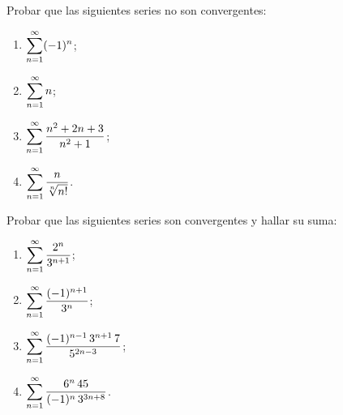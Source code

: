 \item Probar que las siguientes series no son convergentes:
\begin{multicols}{2}
\begin{enumerate}
    \item $\displaystyle\sum_{n=1}^\infty (-1)^n$;
    \item $\displaystyle\sum_{n=1}^\infty n$;
    \item $\displaystyle\sum_{n=1}^\infty \frac{n^2+2n+3}{n^2+1} $;
    \item $\displaystyle\sum_{n=1}^\infty \frac{n}{\sqrt[n]{n!}}$.
\end{enumerate}
\end{multicols}

\item Probar que las siguientes series son convergentes y hallar su suma:
\begin{multicols}{2}
\begin{enumerate}
\item $\displaystyle \sum_{n=1}^\infty \frac{2^n}{3^{n+1}}$;
\item $\displaystyle \sum_{n=1}^\infty \frac{(-1)^{n+1}}{3^n}$;
\item $\displaystyle \sum_{n=1}^\infty \frac{(-1)^{n-1}\,3^{n+1}\,7}{5^{2n-3}}$;
\item $\displaystyle \sum_{n=1}^\infty \frac{6^n \,45 }{(-1)^n \,3^{3n+8}}$.
\end{enumerate}
\end{multicols}


